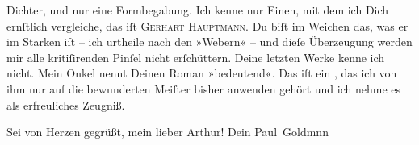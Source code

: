                Dichter, und nur eine Formbegabung. Ich kenne nur Einen, mit dem ich Dich ernſtlich
               vergleiche, das iſt \textsc{Gerhart Hauptmann}. Du biſt im Weichen das, was er im Starken iſt – ich urtheile nach den »Webern« – und dieſe Überzeugung werden mir alle
               kritiſirenden Pinſel nicht erſchüttern. Deine letzten Werke kenne ich nicht. Mein Onkel nennt Deinen Roman »bedeutend«. Das iſt ein
                  \label{K_L02711-6v}\label{K_L02711-6}, das ich von ihm nur auf die bewunderten Meiſter bisher anwenden
               gehört und ich nehme es als erfreuliches Zeugniß.\pend
           
\pstart
           Sei von Herzen gegrüßt, mein lieber Arthur!\pend
           \pstart Dein \spacefill\mbox{Paul Goldmnn}\pend{}\endnumbering{}  
      